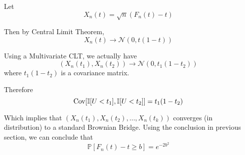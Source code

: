         Let
        \[ X_n(t) = \sqrt{n}(F_n(t)-t) \]

        Then by Central Limit Theorem,
        \[ X_n(t) \longrightarrow \mathcal{N}(0, t(1-t)) \]

        Using a Multivariate CLT, we actually have
        \[ (X_n(t_1), X_n(t_2)) \longrightarrow \mathcal{N}(0,t_1(1-t_2)) \]
        where $t_1(1-t_2)$ is a covariance matrix.

        Therefore
        \[ \mathrm{Cov}[\mathbb{I}[U < t_1], \mathbb{I}[U < t_2]] = t_1(1-t_2) \]

        Which implies that $(X_n(t_1), X_n(t_2), \dots, X_n(t_k))$ converges (in distribution) to a standard Brownian Bridge. Using the conclusion in previous section, we can conclude that
        \[ \mathbb{P}[F_n(t)-t \ge b] = e^{-2b^2} \]
